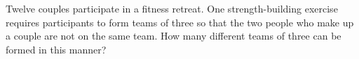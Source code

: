 Twelve couples participate in a fitness retreat. One strength-building exercise requires participants to form teams of three so that the two people who make up a couple are not on the same team. How many different teams of three can be formed in this manner?

